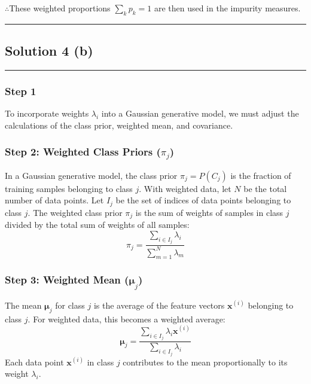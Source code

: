 \documentclass{article}
\begin{document}
\subsubsection*{\normalfont}{$\therefore$These weighted proportions $\sum_{k} p_k = 1$ are then used in the impurity measures.}

\noindent\rule{\textwidth}{0.4pt}

\newpage

\subsection*{Solution 4 (b)}
\noindent\rule{\textwidth}{0.4pt}

\subsubsection*{Step 1}
\parbox{\textwidth}{
To incorporate weights $\lambda_i$ into a Gaussian generative model, we must adjust the calculations of the class prior, weighted mean, and covariance.
}

\subsubsection*{Step 2: Weighted Class Priors ($\pi_j$)}
\parbox{\textwidth}{
In a Gaussian generative model, the class prior $\pi_j = P(C_j)$ is the fraction of training samples belonging to class $j$. With weighted data, let $N$ be the total number of data points. Let $I_j$ be the set of indices of data points belonging to class $j$. The weighted class prior $\pi_j$ is the sum of weights of samples in class $j$ divided by the total sum of weights of all samples:
$$ \pi_j = \frac{\sum_{i \in I_j} \lambda_i}{\sum_{m=1}^{N} \lambda_m} $$
}

\subsubsection*{Step 3: Weighted Mean ($\boldsymbol{\mu}_j$)}
\parbox{\textwidth}{
The mean $\boldsymbol{\mu}_j$ for class $j$ is the average of the feature vectors $\mathbf{x}^{(i)}$ belonging to class $j$. For weighted data, this becomes a weighted average:
$$ \boldsymbol{\mu}_j = \frac{\sum_{i \in I_j} \lambda_i \mathbf{x}^{(i)}}{\sum_{i \in I_j} \lambda_i} $$
Each data point $\mathbf{x}^{(i)}$ in class $j$ contributes to the mean proportionally to its weight $\lambda_i$.
}
\end{document}

